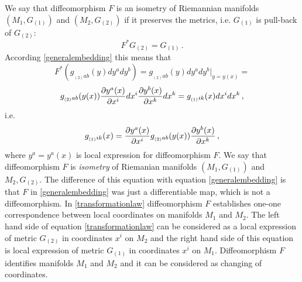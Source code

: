 \documentclass[12pt]{article}
\theoremstyle{theorem}
\numberwithin{equation}{section}
\begin{document}
We say that diffeomorphism $F$ is an isometry of
Riemannian manifolds
 $(M_1,G_{(1)})$ and $(M_2,G_{(2)})$ 
if it  preserves the metrics, i.e.
$G_{(1)}$ is pull-back of $G_{(2)}$:
              \begin{equation}\label{pullback1}
            F^*G_{(2)}=G_{(1)}\,.
               \end{equation}
According \eqref{generalembedding} this means that  
                  $$
      F^*\left(g_{_{(2)}ab}(y)dy^a dy^b\right)=
       g_{_{(2)}ab}(y)dy^a dy^b\big\vert_{y=y(x)}=
                 $$
                \begin{equation*}\label{transformationlaw}
               g_{_{(2)}ab}(y(x))
   {\partial y^a(x)\over \partial x^i}dx^i{\partial y^b(x)\over \partial x^k}dx^k
   =g_{_{(1)}ik}(x)dx^idx^k\,,
               \end{equation*}
    i.e.  \begin{equation}\label{transformationlaw}
   g_{_{(1)}ik}(x)={\partial y^a(x)\over \partial x^i}g_{_{(2)}ab}(y(x))
        {\partial y^b(x)\over \partial x^k}\,,
                 \end{equation}
 where $y^a=y^a(x)$ is local expression for diffeomorphism  $F$.
We say that diffeomorphism $F$ is {\it isometry}
 of Riemanian manifolds
$(M_1, G_{(1)})$ and $M_2,G_{(2)}$.
The difference of this equation with equation
 \eqref{generalembedding} is that $F$ in 
\eqref{generalembedding}
was just a differentiable map, which is not a diffeomorphism.
  In \eqref{transformationlaw}   
diffeomorphism $F$ establishes one-one 
correspondence between local
coordinates on manifolds $M_1$ and $M_2$.
The left hand side of equation \eqref{transformationlaw} can be
considered as a local expression of metric $G_{(2)}$ in coordinates
$x^i$ on $M_2$ and the right hand side of this equation is local
expression of metric $G_{(1)}$ in coordinates $x^i$ on $M_1$.
Diffeomorphism $F$ identifies manifolds $M_1$ and $M_2$
and it can be considered as changing of coordinates.
\end{document}
